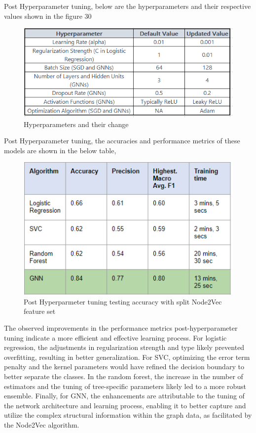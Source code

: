 \documentclass[journal,transmag]{J-NaNA}
\begin{document}
Post Hyperparameter tuning, below are the hyperparameters and their respective values shown in the figure 30

\begin{figure}[htbp]
\centering
\includegraphics[width=\linewidth]{hyperparmeters tuning.PNG} 
\caption{Hyperparameters and their change} 
\label{fig: Performance Metrics} %
\end{figure}

Post Hyperparameter tuning, the accuracies and performance metrics of these models are shown in the below table, 

\begin{figure}[htbp]
\centering
\includegraphics[width=\linewidth]{post_hyper_parameter_tuning.PNG} 
\caption{Post Hyperparmeter tuning testing accuracy with split Node2Vec feature set} 
\label{fig: post-hyper-parameter-tuning} %
\end{figure}

The observed improvements in the performance metrics post-hyperparameter tuning indicate a more efficient and effective learning process. For logistic regression, the adjustments in regularization strength and type likely prevented overfitting, resulting in better generalization. For SVC, optimizing the error term penalty and the kernel parameters would have refined the decision boundary to better separate the classes. In the random forest, the increase in the number of estimators and the tuning of tree-specific parameters likely led to a more robust ensemble. Finally, for GNN, the enhancements are attributable to the tuning of the network architecture and learning process, enabling it to better capture and utilize the complex structural information within the graph data, as facilitated by the Node2Vec algorithm.
\end{document}
